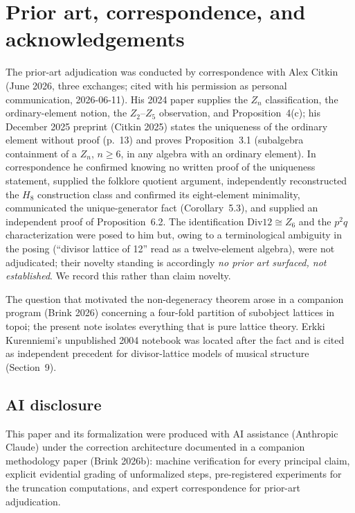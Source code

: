 ﻿\documentclass[11pt]{amsart}
\theoremstyle{plain}
\theoremstyle{definition}
\theoremstyle{remark}
\newcommand{\Znn}[1]{Z_{#1}}
\begin{document}
\section{Prior art, correspondence, and acknowledgements}

The prior-art adjudication was conducted by correspondence with Alex Citkin
(June 2026, three exchanges; cited with his permission as personal
communication, 2026-06-11). His 2024 paper supplies the $\Znn{n}$
classification, the ordinary-element notion, the $\Znn{2}$--$\Znn{5}$
observation, and Proposition~4(c); his December 2025 preprint (Citkin 2025)
states the uniqueness of the ordinary element without proof (p.~13) and proves
Proposition~3.1 (subalgebra containment of a $\Znn{n}$, $n \ge 6$, in any
algebra with an ordinary element). In correspondence he confirmed knowing no
written proof of the uniqueness statement, supplied the folklore quotient
argument, independently reconstructed the $H_8$ construction class and
confirmed its eight-element minimality, communicated the unique-generator fact
(Corollary~5.3), and supplied an independent proof of Proposition~6.2. The
identification $\mathrm{Div}12 \cong \Znn{6}$ and the $p^2 q$ characterization
were posed to him but, owing to a terminological ambiguity in the posing
(``divisor lattice of 12'' read as a twelve-element algebra), were not
adjudicated; their novelty standing is accordingly \emph{no prior art
surfaced, not established}. We record this rather than claim novelty.

The question that motivated the non-degeneracy theorem arose in a companion
program (Brink 2026) concerning a four-fold partition of subobject lattices in
topoi; the present note isolates everything that is pure lattice theory. Erkki
Kurenniemi's unpublished 2004 notebook was located after the fact and is cited
as independent precedent for divisor-lattice models of musical structure
(Section~9).

\subsection*{AI disclosure}
This paper and its formalization were produced with AI assistance (Anthropic
Claude) under the correction architecture documented in a companion
methodology paper (Brink 2026b): machine verification for every principal
claim, explicit evidential grading of unformalized steps, pre-registered
experiments for the truncation computations, and expert correspondence for
prior-art adjudication.
\end{document}
